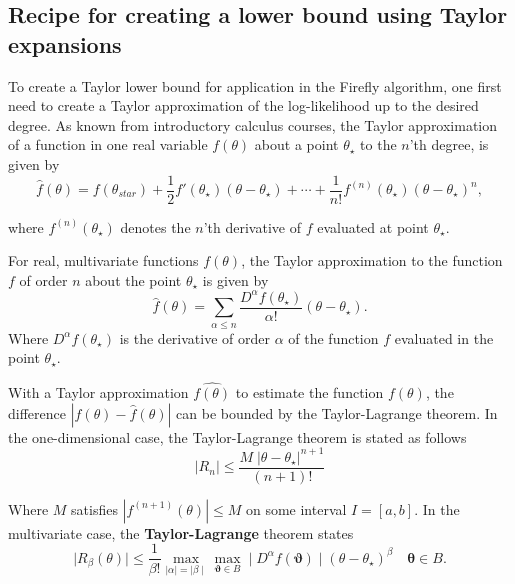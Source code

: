 \subsection{Recipe for creating a lower bound using Taylor expansions} \label{subsec:taylor_bound_intro}
To create a Taylor lower bound for application in the Firefly algorithm, one first need to create a Taylor approximation of the log-likelihood up to the desired degree. As known from introductory calculus courses, the Taylor approximation of a function in one real variable $f\left(\theta\right)$ about a point $\theta_{\star}$ to the $n$'th degree, is given by 
\begin{equation}\label{eq:taylor} 
\hat{f}\left(\theta\right) = f\left(\theta_{star}\right) + \frac{1}{2} f'\left(\theta_{\star}\right) \left(\theta - \theta_{\star}\right) + \cdots + \frac{1}{n!} f^{\left(n\right)} \left(\theta_{\star}\right) \left(\theta-\theta_{\star}\right)^n,  
\end{equation}

where $f^{\left(n\right)}\left(\theta_{\star}\right)$ denotes the $n$'th derivative of $f$ evaluated at point $\theta_{\star}$. 

For real, multivariate functions $f\left(\theta\right)$, the Taylor approximation to the function $f$ of order $n$ about the point $\theta_{\star}$ is given by 
\begin{equation}
\hat{f}\left(\theta\right) = \sum_{\alpha \leq n} \frac{D^{\alpha}f\left(\theta_{\star}\right)}{\alpha!}\left(\theta - \theta_{\star}\right).   
\end{equation}
Where $D^{\alpha} f\left(\theta_{\star}\right)$ is the derivative of order $\alpha$ of the function $f$ evaluated in the point $\theta_{\star}$.  

With a Taylor approximation $\hat{f\left(\theta\right)}$ to estimate the function $f\left(\theta\right)$, the difference $\left|f\left(\theta\right) - \hat{f}\left(\theta\right)\right|$ can be bounded by the Taylor-Lagrange theorem. In the one-dimensional case, the Taylor-Lagrange theorem is stated as follows
\begin{equation}\label{eq:taylor_lagr}
|R_n| \leq \frac{M\;|\theta-\theta_{\star}|^{n+1}}{\left(n+1\right)!}
\end{equation}

Where $M$ satisfies $|f^{\left(n+1\right)}\left(\theta\right)| \leq M$ on some interval $I = \left[a, b\right]$.
In the multivariate case, the \textbf{Taylor-Lagrange} theorem states
\begin{equation}\label{eq:taylor_lagr_multivar}
\mid R_{\beta}\left(\theta\right) \mid \leq\frac{1}{\beta!}\max_{\mid \alpha \mid  = \mid \beta\mid } \max_{\mathbf{\vartheta} \in B}\mid D^{\alpha} f\left(\mathbf{\vartheta}\right)\mid \left(\theta - \theta_{\star}\right)^{\beta}\quad \mathbf{\theta}\in B. 
\end{equation}

